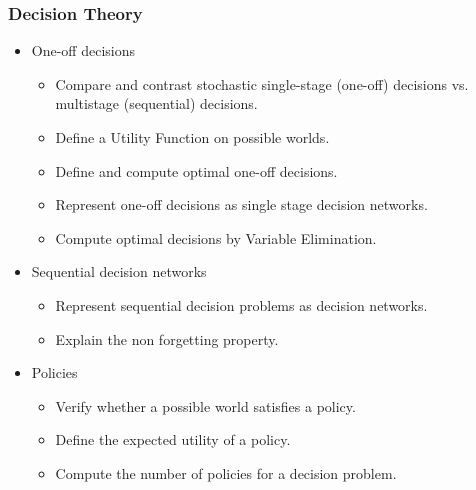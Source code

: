 \documentclass{article}
\begin{document}
\subsubsection*{Decision Theory}

\begin{itemize}
    \item One-off decisions
        \begin{itemize}
            \item Compare and contrast stochastic single-stage (one-off) decisions vs. multistage (sequential) decisions.
            \item Define a Utility Function on possible worlds.
            \item Define and compute optimal one-off decisions.
            \item Represent one-off decisions as single stage decision networks.
            \item Compute optimal decisions by Variable Elimination.
        \end{itemize}
    \item Sequential decision networks
        \begin{itemize}
            \item Represent sequential decision problems as decision networks.
            \item Explain the non forgetting property.
        \end{itemize}
    \item Policies
        \begin{itemize}
            \item Verify whether a possible world satisfies a policy.
            \item Define the expected utility of a policy.
            \item Compute the number of policies for a decision problem.
        \end{itemize}
\end{itemize}
\end{document}
